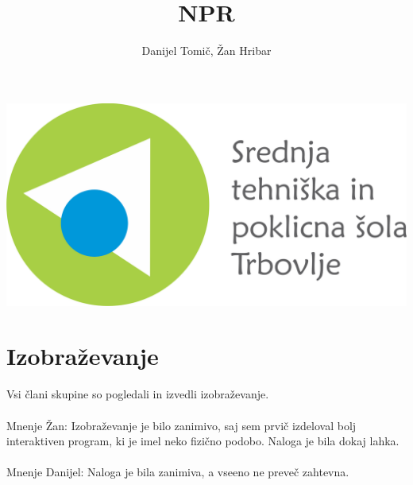 \documentclass[a4paper]{article}
\author{Danijel Tomič, Žan Hribar}
\title{NPR}
\begin{document}
\maketitle

\begin{center}
\includegraphics[scale=0.5]{Logotip-z-napisom.png}
\end{center}
\newpage

\section{Izobraževanje}
Vsi člani skupine so pogledali in izvedli izobraževanje.\\\\
Mnenje Žan: Izobraževanje je bilo zanimivo, saj sem prvič izdeloval bolj interaktiven program, ki je imel neko fizično  podobo. Naloga je bila dokaj lahka.\\\\
Mnenje Danijel: Naloga je bila zanimiva, a vseeno ne preveč zahtevna. 
\end{document}
